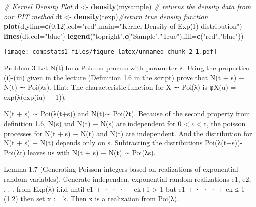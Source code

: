 \documentclass[
]{article}
\newenvironment{Shaded}{\begin{snugshade}}{\end{snugshade}}
\newcommand{\CommentTok}[1]{\textcolor[rgb]{0.56,0.35,0.01}{\textit{#1}}}
\newcommand{\DataTypeTok}[1]{\textcolor[rgb]{0.13,0.29,0.53}{#1}}
\newcommand{\DecValTok}[1]{\textcolor[rgb]{0.00,0.00,0.81}{#1}}
\newcommand{\KeywordTok}[1]{\textcolor[rgb]{0.13,0.29,0.53}{\textbf{#1}}}
\newcommand{\NormalTok}[1]{#1}
\newcommand{\StringTok}[1]{\textcolor[rgb]{0.31,0.60,0.02}{#1}}
\begin{document}
\begin{Shaded}
\begin{Highlighting}[]
\CommentTok{# Kernel Density Plot}
\NormalTok{d <-}\StringTok{ }\KeywordTok{density}\NormalTok{(mysample) }\CommentTok{# returns the density data from our PIT method  }
\NormalTok{dt <-}\StringTok{ }\KeywordTok{density}\NormalTok{(texp)}\CommentTok{#return true density function}
\KeywordTok{plot}\NormalTok{(d,}\DataTypeTok{ylim=}\KeywordTok{c}\NormalTok{(}\DecValTok{0}\NormalTok{,}\DecValTok{12}\NormalTok{),}\DataTypeTok{col=}\StringTok{"red"}\NormalTok{,}\DataTypeTok{main=}\StringTok{"Kernel Density of Exp(1)-distribution"}\NormalTok{)}
\KeywordTok{lines}\NormalTok{(dt,}\DataTypeTok{col=}\StringTok{"blue"}\NormalTok{)}
\KeywordTok{legend}\NormalTok{(}\StringTok{"topright"}\NormalTok{,}\KeywordTok{c}\NormalTok{(}\StringTok{"Sample"}\NormalTok{,}\StringTok{"True"}\NormalTok{),}\DataTypeTok{fill=}\KeywordTok{c}\NormalTok{(}\StringTok{"red"}\NormalTok{,}\StringTok{"blue"}\NormalTok{))}
\end{Highlighting}
\end{Shaded}

\texttt{[image: compstats1\_files/figure-latex/unnamed-chunk-2-1.pdf]}

Problem 3 Let N(t) be a Poisson process with parameter λ. Using the
properties (i)-(iii) given in the lecture (Definition 1.6 in the script)
prove that N(t + s) − N(t) ∼ Poi(λs). Hint: The characteristic function
for X ∼ Poi(λ) is φX(u) = exp(λ(exp(iu) − 1)).

N(t + s) ∼ Poi(λ(t+s)) and N(t)∼ Poi(λt). Because of the second property
from definition 1.6, N(s) and N(t) − N(s) are independent for 0
\textless{} s \textless{} t, the poisson processes for N(t + s) − N(t)
and N(t) are independent. And the distribution for N(t + s) − N(t)
depends only on s. Subtracting the distributions Poi(λ(t+s))- Poi(λt)
leaves us with N(t + s) − N(t) ∼ Poi(λs).

Lemma 1.7 (Generating Poisson integers based on realizations of
exponential random variables). Generate independent exponential random
realizations e1, e2, . . . from Exp(λ) i.i.d until e1 + · · · + ek+1
\textgreater{} 1 but e1 + · · · + ek ≤ 1 (1.2) then set x := k. Then x
is a realization from Poi(λ).
\end{document}
